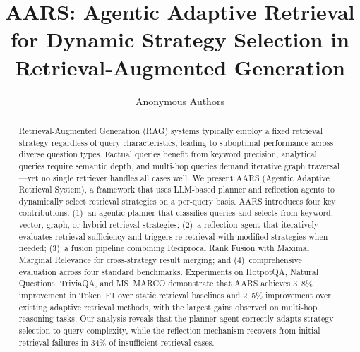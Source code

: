 \documentclass[runningheads]{llncs}
\begin{document}
\title{AARS: Agentic Adaptive Retrieval for Dynamic Strategy Selection in Retrieval-Augmented Generation}

\author{Anonymous Authors}

\maketitle

\begin{abstract}
Retrieval-Augmented Generation (RAG) systems typically employ a fixed retrieval strategy regardless of query characteristics, leading to suboptimal performance across diverse question types. Factual queries benefit from keyword precision, analytical queries require semantic depth, and multi-hop queries demand iterative graph traversal---yet no single retriever handles all cases well. We present AARS (Agentic Adaptive Retrieval System), a framework that uses LLM-based planner and reflection agents to dynamically select retrieval strategies on a per-query basis. AARS introduces four key contributions: (1)~an agentic planner that classifies queries and selects from keyword, vector, graph, or hybrid retrieval strategies; (2)~a reflection agent that iteratively evaluates retrieval sufficiency and triggers re-retrieval with modified strategies when needed; (3)~a fusion pipeline combining Reciprocal Rank Fusion with Maximal Marginal Relevance for cross-strategy result merging; and (4)~comprehensive evaluation across four standard benchmarks. Experiments on HotpotQA, Natural Questions, TriviaQA, and MS~MARCO demonstrate that AARS achieves 3--8\% improvement in Token~F1 over static retrieval baselines and 2--5\% improvement over existing adaptive retrieval methods, with the largest gains observed on multi-hop reasoning tasks. Our analysis reveals that the planner agent correctly adapts strategy selection to query complexity, while the reflection mechanism recovers from initial retrieval failures in 34\% of insufficient-retrieval cases.

\end{abstract}

\end{document}
